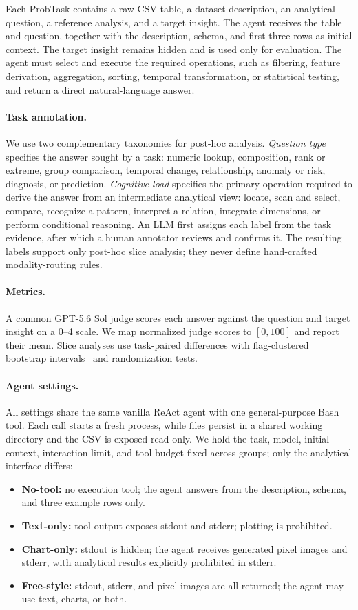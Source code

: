 \documentclass{article}
\begin{document}
Each ProbTask contains a raw CSV table, a dataset description, an analytical question, a reference analysis, and a target insight.
The agent receives the table and question, together with the description, schema, and first three rows as initial context.
The target insight remains hidden and is used only for evaluation.
The agent must select and execute the required operations, such as filtering, feature derivation, aggregation, sorting, temporal transformation, or statistical testing, and return a direct natural-language answer.

\paragraph{Task annotation.}
We use two complementary taxonomies for post-hoc analysis.
\emph{Question type} specifies the answer sought by a task: numeric lookup, composition, rank or extreme, group comparison, temporal change, relationship, anomaly or risk, diagnosis, or prediction.
\emph{Cognitive load} specifies the primary operation required to derive the answer from an intermediate analytical view: locate, scan and select, compare, recognize a pattern, interpret a relation, integrate dimensions, or perform conditional reasoning.
An LLM first assigns each label from the task evidence, after which a human annotator reviews and confirms it.
The resulting labels support only post-hoc slice analysis; they never define hand-crafted modality-routing rules.

\paragraph{Metrics.}
A common GPT-5.6 Sol judge scores each answer against the question and target insight on a 0--4 scale.
We map normalized judge scores to $[0,100]$ and report their mean.
Slice analyses use task-paired differences with flag-clustered bootstrap intervals~\citep{efron1993bootstrap} and randomization tests.

\paragraph{Agent settings.}
All settings share the same vanilla ReAct agent with one general-purpose Bash tool.
Each call starts a fresh process, while files persist in a shared working directory and the CSV is exposed read-only.
We hold the task, model, initial context, interaction limit, and tool budget fixed across groups; only the analytical interface differs:
\begin{itemize}
  \item \textbf{No-tool:} no execution tool; the agent answers from the description, schema, and three example rows only.
  \item \textbf{Text-only:} tool output exposes stdout and stderr; plotting is prohibited.
  \item \textbf{Chart-only:} stdout is hidden; the agent receives generated pixel images and stderr, with analytical results explicitly prohibited in stderr.
  \item \textbf{Free-style:} stdout, stderr, and pixel images are all returned; the agent may use text, charts, or both.
\end{itemize}
\end{document}
